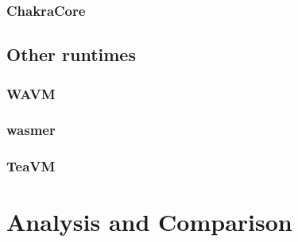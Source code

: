 \subsubsection{ChakraCore}

\subsection{Other runtimes}

\subsubsection{WAVM}

\subsubsection{wasmer}

\subsubsection{TeaVM}

\section{Analysis and Comparison}
